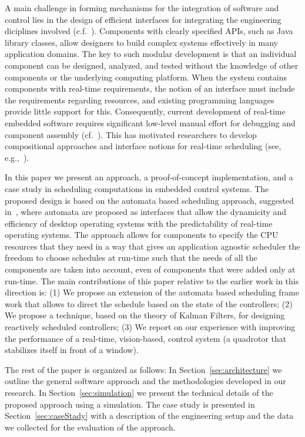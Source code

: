 \documentclass{sig-alternate-ipsn13}
\begin{document}
A main challenge in forming mechanisms for the integration of software and control lies in the design of efficient interfaces for integrating the engineering diciplines involved (c.f.~\cite{weiss2007automata}). Components with clearly specified APIs, such as Java library classes, allow designers to build
complex systems effectively in many application domains.  The key to such modular development is
that an individual component can be designed, analyzed, and tested without the knowledge of other
components or the underlying computing platform. When the system contains components with
real-time requirements, the notion of an interface must include the requirements regarding
resources, and existing programming languages provide little support for this.  Consequently,
current development of real-time embedded software requires significant low-level manual effort for
debugging and component assembly (cf.~\cite{Lee00,IEEE03,HS06}).  This has motivated 
researchers to develop compositional approaches and interface notions for real-time scheduling (see, e.g.,~\cite{RS01,dH01,MF01,CAHS03,SL08,SLBS04,TWS06,DBLP:conf/lctrts/AuerbachBIKRRT07}).


In this paper we present an approach, a proof-of-concept implementation, and a case study in scheduling computations in embedded control systems. The proposed design is based on the automata based scheduling approach, suggested in~\cite{weiss2007automata,RTComposer,AW08}, where automata are proposed as interfaces that allow the dynamicity and efficiency of desktop operating systems with the predictability of real-time operating systems. The approach allows for components to specify the CPU resources that they need in a way that gives an application agnostic scheduler the freedom to choose schedules at run-time such that the needs of all the components are taken into account, even of components that were added only at run-time.  The main contributions of this paper relative to the earlier work in this direction is:
(1) We propose an extension of the automata based scheduling frame work that allows to direct the schedule based on the state of the controllers; (2) We propose a technique, based on the theory of Kalman Filters, for designing reactively scheduled controllers; (3) We report on our experience with improving the performance of a real-time, vision-based, control system (a quadrotor that stabilizes itself in front of a window).

The rest of the paper is organized as follows: In Section~\ref{sec:architecture} we outline the general software approach and the methodologies developed in our research. In Section~\ref{sec:simulation} we present the technical details of the proposed approach using a simulation. The case study is presented in Section~\ref{sec:caseStady} with a description of the engineering setup and the data we collected for the evaluation of the approach.
\end{document}

